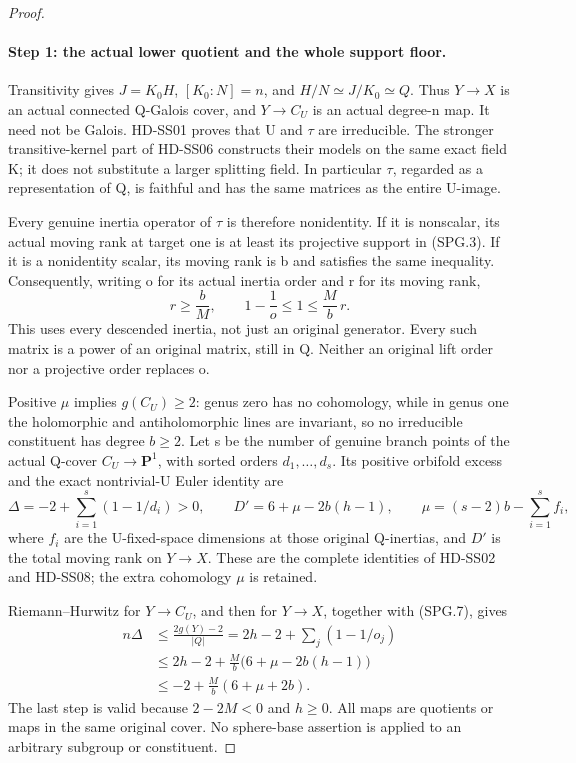 \begin{proof}
\paragraph{Step 1: the actual lower quotient and the whole support floor.}
Transitivity gives \(J=K_0H\), \([K_0:N]=n\), and
\(H/N\simeq J/K_0\simeq Q\).  Thus \(Y\to X\) is an actual
connected Q-Galois cover, and \(Y\to C_U\) is an actual degree-n map.
It need not be Galois.  HD-SS01 proves that U and \(\tau\) are irreducible.
The stronger transitive-kernel part of HD-SS06 constructs their models
on the same exact field K; it does not substitute a larger splitting field.
In particular \(\tau\), regarded as a representation of Q, is faithful
and has the same matrices as the entire U-image.

Every genuine inertia operator of \(\tau\) is therefore nonidentity.
If it is nonscalar, its actual moving rank at target one is at least
its projective support in (SPG.3).  If it is a nonidentity scalar,
its moving rank is b and satisfies the same inequality.  Consequently,
writing o for its actual inertia order and r for its moving rank,
\[
             r\ge\frac bM,\qquad
             1-\frac1o\le1\le\frac Mb\,r.
 \tag{SPG.7}
\]
This uses every descended inertia, not just an original generator.
Every such matrix is a power of an original matrix, still in Q.
Neither an original lift order nor a projective order replaces o.

Positive \(\mu\) implies \(g(C_U)\ge2\): genus zero has no
cohomology, while in genus one the holomorphic and antiholomorphic
lines are invariant, so no irreducible constituent has degree \(b\ge2\).
Let s be the number of genuine branch points of the actual Q-cover
\(C_U\to\mathbf P^1\), with sorted orders \(d_1,\ldots,d_s\).
Its positive orbifold excess and the exact nontrivial-U Euler identity are
\[
 \Delta=-2+\sum_{i=1}^s(1-1/d_i)>0,\qquad
 D'=6+\mu-2b(h-1),\qquad
 \mu=(s-2)b-\sum_{i=1}^s f_i,
 \tag{SPG.8}
\]
where \(f_i\) are the U-fixed-space dimensions at those original
Q-inertias, and \(D'\) is the total moving rank on \(Y\to X\).
These are the complete identities of HD-SS02 and HD-SS08; the extra
cohomology \(\mu\) is retained.

Riemann--Hurwitz for \(Y\to C_U\), and then for \(Y\to X\),
together with (SPG.7), gives
\[
 \begin{split}
 n\Delta&\le\frac{2g(Y)-2}{|Q|}
       =2h-2+\sum_j(1-1/o_j)\\
       &\le2h-2+\frac Mb\bigl(6+\mu-2b(h-1)\bigr)\\
       &\le-2+\frac Mb(6+\mu+2b).
 \end{split}
 \tag{SPG.9}
\]
The last step is valid because \(2-2M<0\) and \(h\ge0\).
All maps are quotients or maps in the same original cover.  No
sphere-base assertion is applied to an arbitrary subgroup or constituent.


\end{proof}
